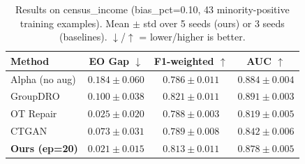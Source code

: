 \begin{table}[t]
\centering
\caption{Results on census\_income (bias\_pct=0.10, 43 minority-positive training examples). Mean $\pm$ std over 5 seeds (ours) or 3 seeds (baselines). $\downarrow$/$\uparrow$ = lower/higher is better.}
\label{tab:census_bias010}
\begin{tabular}{lccc}
\hline
Method & EO Gap $\downarrow$ & F1-weighted $\uparrow$ & AUC $\uparrow$ \\
\hline
    Alpha (no aug) & $0.184\pm0.060$ & $0.786\pm0.011$ & $0.884\pm0.004$ \\
    GroupDRO & $0.100\pm0.038$ & $0.821\pm0.011$ & $0.891\pm0.003$ \\
    OT Repair & $0.025\pm0.020$ & $0.788\pm0.003$ & $0.819\pm0.005$ \\
    CTGAN & $0.073\pm0.031$ & $0.789\pm0.008$ & $0.842\pm0.006$ \\
    \textbf{Ours (ep=20)} & $0.021\pm0.015$ & $0.813\pm0.011$ & $0.878\pm0.005$ \\
\hline
\end{tabular}
\end{table}